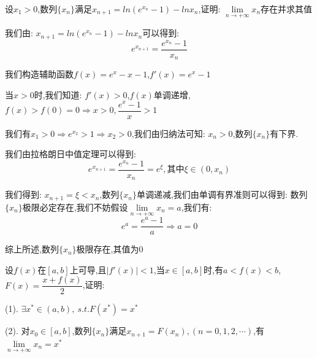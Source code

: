 \begin{proposition}
	设$x_{1}>0$,数列$\{x_{n}\}$满足$x_{n+1}=ln(e^{x_{n}}-1)-ln x_{n}$,证明:  $\lim\limits_{n\rightarrow +\infty}x_{n}$存在并求其值
\end{proposition}
\begin{solution}
	
	我们由:  $x_{n+1}=ln(e^{x_{n}}-1)-ln x_{n}$可以得到:  
	$$e^{x_{n+1}}=\dfrac{e^{x_{n}}-1}{x_{n}}$$
	
	我们构造辅助函数$f(x)=e^x-x-1$,$f'(x)=e^{x}-1$
	
	当$x>0$时,我们知道:  $f'(x)>0$,$f(x)$单调递增,$f(x)>f(0)=0\Rightarrow  x>0,\dfrac{e^x-1}{x}>1$
	
	我们有$x_{1}>0\Rightarrow e^{x_{2}}>1\Rightarrow x_{2}>0$,我们由归纳法可知:  $x_{n}>0$,数列$\{ x_{n}\}$有下界.
	
	我们由拉格朗日中值定理可以得到:  
	$$e^{x_{n+1}}=\dfrac{e^{x_{n}}-1}{x_{n}}=e^{\xi},\text{其中}\xi\in(0,x_{n})$$
	
	我们得到:  $x_{n+1}=\xi<x_{n}$,数列$\{x_{n}\}$单调递减,我们由单调有界准则可以得到:  数列$\{x_{n}\}$极限必定存在,我们不妨假设$\lim\limits_{n\rightarrow +\infty}x_{n}=a$,我们有:  
	$$e^{a}=\dfrac{e^a-1}{a}\Rightarrow a=0$$
	
	综上所述,数列$\{x_{n}\}$极限存在,其值为$0$
\end{solution}
\begin{proposition}
	设$f(x)$在$[a,b]$上可导,且$|f'(x)|<1$,当$x\in[a,b]$时,有$a<f(x)<b$,$F(x)=\dfrac{x+f(x)}{2}$,证明:  

(1). $\exists x^{*}\in(a,b),\ s.t. F(x^{*})=x^{*}$

(2). 对$x_{0}\in[a,b]$,数列$\{x_{n}\}$满足$x_{n+1}=F(x_{n}),(n=0,1,2,\cdots)$,有$\lim\limits_{n\rightarrow+\infty}x_{n}=x^{*}$

\end{proposition}
